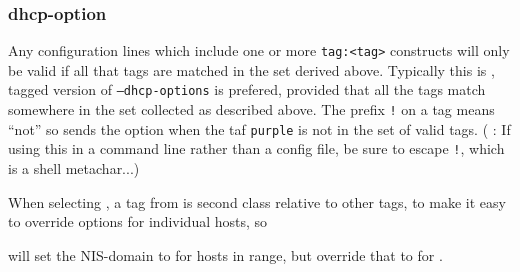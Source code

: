 {  

  \subsubsection{dhcp-option}


  
  Any configuration lines which include one or more \texttt{tag:<tag>}
  constructs will only be valid if all that tags are matched in the set derived
  above. Typically this is , tagged version of
  \texttt{--dhcp-options} is prefered, provided that all the tags match
  somewhere in the set collected as described above. The prefix \texttt{!} on a
  tag means ``not'' so  sends the
  option when the taf \texttt{purple} is not in the set of valid tags.
  ( : If using
  this in a command line rather than a config file, be sure to escape
  \texttt{!}, which is a shell metachar...)

  When selecting , a tag from  is
  second class relative to other tags, to make it easy to override options for
  individual hosts, so

  will set the NIS-domain to  for hosts in range, but override
  that to  for .

}